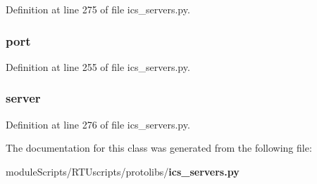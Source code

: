 Definition at line 275 of file ics\+\_\+servers.\+py.

\subsubsection[{port}]{\setlength{\rightskip}{0pt plus 5cm}port}\label{classprotolibs_1_1ics__servers_1_1_modbus_t_c_p_test_af8fb0f45ee0195c7422a49e6a8d72369}


Definition at line 255 of file ics\+\_\+servers.\+py.

\subsubsection[{server}]{\setlength{\rightskip}{0pt plus 5cm}server}\label{classprotolibs_1_1ics__servers_1_1_modbus_t_c_p_test_a4acfaa4e2d9b21de60c9a6fc63cfaa3a}


Definition at line 276 of file ics\+\_\+servers.\+py.



The documentation for this class was generated from the following file\+:\begin{DoxyCompactItemize}
\item 
module\+Scripts/\+R\+T\+Uscripts/protolibs/{\bf ics\+\_\+servers.\+py}\end{DoxyCompactItemize}
